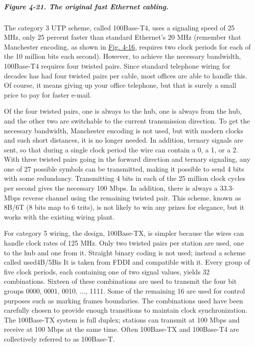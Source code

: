 \documentclass[b5paper,11pt]{memoir}
\begin{document}
\subparagraph[Figure 4-21. The original fast Ethernet
cabling.]{\texorpdfstring{\protect\hypertarget{0130661023_ch04lev1sec3.htmlux5cux23ch04fig21}{}{}Figure
4-21. The original fast Ethernet
cabling.}{Figure 4-21. The original fast Ethernet cabling.}}


The category 3 UTP scheme, called {100Base-T4}, uses a signaling speed
of 25 MHz, only 25 percent faster than standard Ethernet's 20 MHz
(remember that Manchester encoding, as shown in
\protect\hyperlink{0130661023_ch04lev1sec3.htmlux5cux23ch04fig16}{Fig.
4-16}, requires two clock periods for each of the 10 million bits each
second). However, to achieve the necessary bandwidth, 100Base-T4
requires four twisted pairs. Since standard telephone wiring for decades
has had four twisted pairs per cable, most offices are able to handle
this. Of course, it means giving up your office telephone, but that is
surely a small price to pay for faster e-mail.

Of the four twisted pairs, one is always to the hub, one is always from
the hub, and the other two are switchable to the current transmission
direction. To get the necessary bandwidth, Manchester encoding is not
used, but with modern clocks and such short distances, it is no longer
needed. In addition, ternary signals are sent, so that during a single
clock period the wire can contain a 0, a 1, or a 2. With three twisted
pairs going in the forward direction and ternary signaling, any one of
27 possible symbols can be transmitted, making it possible to send 4
bits with some redundancy. Transmitting 4 bits in each of the 25 million
clock cycles per second gives the necessary 100 Mbps. In addition, there
is always a 33.3-Mbps reverse channel using the remaining twisted pair.
This scheme, known as {8B/6T} (8 bits map to 6 trits), is not likely to
win any prizes for elegance, but it works with the existing wiring
plant.

For category 5 wiring, the design, {100Base-TX}, is simpler because the
wires can handle clock rates of 125 MHz. Only two twisted pairs per
station are used, one to the hub and one from it. Straight binary coding
is not used; instead a scheme called used{4B/5B}is It is taken from FDDI
and compatible with it. Every group of five clock periods, each
containing one of two signal values, yields 32 combinations. Sixteen of
these combinations are used to transmit the four bit groups 0000, 0001,
0010, ..., 1111. Some of the remaining 16 are used for control purposes
such as marking frames boundaries. The combinations used have been
carefully chosen to provide enough transitions to maintain clock
synchronization. The 100Base-TX system is full duplex; stations can
transmit at 100 Mbps and receive at 100 Mbps at the same time. Often
100Base-TX and 100Base-T4 are collectively referred to as {100Base-T}.
\end{document}
